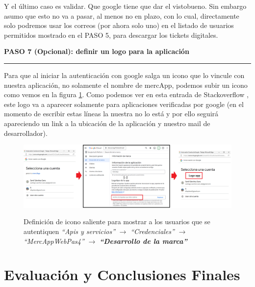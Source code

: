 \documentclass[a4paper,12pt]{report}
\begin{document}
	Y el último caso es validar. Que google tiene que dar el vistobueno. Sin embargo asumo que esto no va a pasar, al menos no en plazo, con lo cual, directamente solo podremos usar los correos (por ahora solo uno) en el listado de usuarios permitidos mostrado en el PASO 5, para descargar los tickets digitales.
	
	
	\noindent \textbf{PASO 7 (Opcional): definir un logo para la aplicación}
	\vspace{.1em}
	\hrule
	\vspace{.5em}
	
	Para que al iniciar la autenticación con google salga un icono que lo vincule con nuestra aplicación, no solamente el nombre de mercApp, podemos subir un icono como vemos en la figura \ref{fig:mercAppLogo}. Como podemos ver en esta entrada de Stackoverflow \cite{stackoverflow_oauth_consent_logo}, este logo va a aparecer solamente para aplicaciones verificadas por google (en el momento de escribir estas líneas la nuestra no lo está y por ello seguirá apareciendo un link a la ubicación de la aplicación y nuestro mail de desarrollador).
	
	\FloatBarrier
	\setlength{\belowcaptionskip}{3pt}
	\begin{figure}[H]
		\centering
		\caption{Definición de icono saliente para mostrar a los usuarios que se autentiquen \textit{``Apis y servicios''} $\rightarrow$ \textit{``Credenciales''} $\rightarrow$ \textit{``MercAppWebPas4''} $\rightarrow$ \textbf{\textit{``Desarrollo de la marca''}}}
		\includegraphics[width=1\linewidth]{img/mercAppLogo}
		\label{fig:mercAppLogo}
	\end{figure}
	\FloatBarrier
	
	
	
	
	
	\chapter{Evaluación y Conclusiones Finales} %
	

	
	
\end{document}
